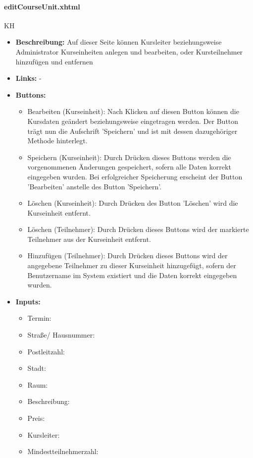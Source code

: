 				\paragraph{editCourseUnit.xhtml}
					KH\\
					\begin{itemize}
						\item \textbf{Beschreibung:} Auf dieser Seite können Kursleiter beziehungsweise Administrator Kurseinheiten anlegen und bearbeiten, oder Kursteilnehmer hinzufügen und entfernen
						\item \textbf{Links:} -
						\item \textbf{Buttons:}
							\begin{itemize}
								\item Bearbeiten (Kurseinheit): Nach Klicken auf diesen Button können die Kursdaten geändert beziehungsweise eingetragen werden. Der Button trägt nun die Aufschrift 'Speichern' und ist mit dessen dazugehöriger Methode hinterlegt.
								\item Speichern (Kurseinheit): Durch Drücken dieses Buttons werden die vorgenommenen Änderungen gespeichert, sofern alle Daten korrekt eingegeben wurden. Bei erfolgreicher Speicherung erscheint der Button 'Bearbeiten' anstelle des Button 'Speichern'.
								\item Löschen (Kurseinheit): Durch Drücken des Button 'Löschen' wird die Kurseinheit entfernt.
								\item Löschen (Teilnehmer): Durch Drücken dieses Buttons wird der markierte Teilnehmer aus der Kurseinheit entfernt.
								\item Hinzufügen (Teilnehmer): Durch Drücken dieses Buttons wird der angegebene Teilnehmer zu dieser Kurseinheit hinzugefügt, sofern der Benutzername im System existiert und die Daten korrekt eingegeben wurden.
							\end{itemize}
						\item \textbf{Inputs:}
							\begin{itemize}
								\item Termin:
								\item Straße/ Hausnummer:
								\item Postleitzahl:
								\item Stadt:
								\item Raum:
								\item Beschreibung:
								\item Preis:
								\item Kursleiter:
								\item Mindestteilnehmerzahl:

\end{itemize}
\end{itemize}
